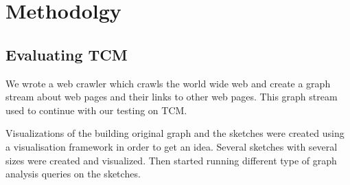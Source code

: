 \documentclass[conference]{IEEEtran}
\begin{document}
%



\section{Methodolgy}
\subsection{Evaluating TCM}

We wrote a web crawler which crawls the world wide web and create a graph stream about web pages and their links to other web pages. This graph stream used to continue with our testing on TCM. 


Visualizations of the building original graph and the sketches were created using a visualisation framework in order to get an idea. Several sketches with several sizes were created and visualized. Then started running different type of graph analysis queries on the sketches. 
\end{document}
